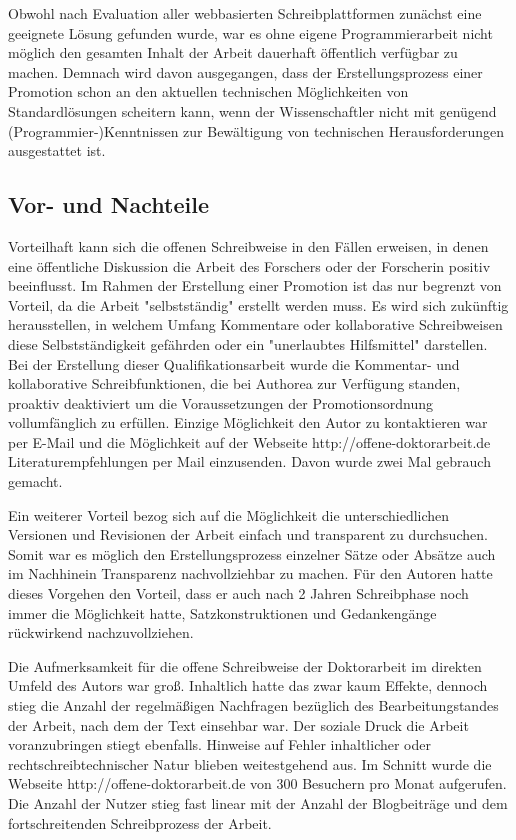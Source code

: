 Obwohl nach Evaluation aller webbasierten Schreibplattformen zunächst eine geeignete Lösung gefunden wurde, war es ohne eigene Programmierarbeit nicht möglich den gesamten Inhalt der Arbeit dauerhaft öffentlich verfügbar zu machen. Demnach wird davon ausgegangen, dass der Erstellungsprozess einer Promotion schon an den aktuellen technischen Möglichkeiten von Standardlösungen scheitern kann, wenn der Wissenschaftler nicht mit genügend (Programmier-)Kenntnissen zur Bewältigung von technischen Herausforderungen ausgestattet ist.

\subsection{Vor- und Nachteile}

Vorteilhaft kann sich die offenen Schreibweise in den Fällen erweisen, in denen eine öffentliche Diskussion die Arbeit des Forschers oder der Forscherin positiv beeinflusst. Im Rahmen der Erstellung einer Promotion ist das nur begrenzt von Vorteil, da die Arbeit "selbstständig" erstellt werden muss. Es wird sich zukünftig herausstellen, in welchem Umfang Kommentare oder kollaborative Schreibweisen diese Selbstständigkeit gefährden oder ein "unerlaubtes Hilfsmittel" \cite{promotionsordnung_leuphana_kuwi_2011} darstellen. Bei der Erstellung dieser Qualifikationsarbeit wurde die Kommentar- und kollaborative Schreibfunktionen, die bei Authorea zur Verfügung standen, proaktiv deaktiviert um die Voraussetzungen der Promotionsordnung vollumfänglich zu erfüllen. Einzige Möglichkeit den Autor zu kontaktieren war per E-Mail und die Möglichkeit auf der Webseite http://offene-doktorarbeit.de Literaturempfehlungen per Mail einzusenden. Davon wurde zwei Mal gebrauch gemacht.

Ein weiterer Vorteil bezog sich auf die Möglichkeit die unterschiedlichen Versionen und Revisionen der Arbeit einfach und transparent zu durchsuchen. Somit war es möglich den Erstellungsprozess einzelner Sätze oder Absätze auch im Nachhinein Transparenz nachvollziehbar zu machen. Für den Autoren hatte dieses Vorgehen den Vorteil, dass er auch nach 2 Jahren Schreibphase noch immer die Möglichkeit hatte, Satzkonstruktionen und Gedankengänge rückwirkend nachzuvollziehen.

Die Aufmerksamkeit für die offene Schreibweise der Doktorarbeit im direkten Umfeld des Autors war groß. Inhaltlich hatte das zwar kaum Effekte, dennoch stieg die Anzahl der regelmäßigen Nachfragen bezüglich des Bearbeitungstandes der Arbeit, nach dem der Text einsehbar war. Der soziale Druck die Arbeit voranzubringen stiegt ebenfalls. Hinweise auf Fehler inhaltlicher oder rechtschreibtechnischer Natur blieben weitestgehend aus. Im Schnitt wurde die Webseite http://offene-doktorarbeit.de von 300 Besuchern pro Monat aufgerufen. Die Anzahl der Nutzer stieg fast linear mit der Anzahl der Blogbeiträge und dem fortschreitenden Schreibprozess der Arbeit.

